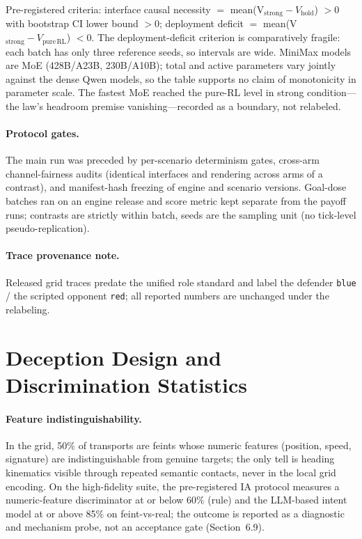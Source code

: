 \documentclass[sigconf,anonymous]{aamas}
\begin{document}
Pre-registered criteria: interface causal necessity $=$ mean(V$_{\mathrm{strong}} - V_{\mathrm{hold}}$) $> 0$ with bootstrap CI lower bound $> 0$; deployment deficit $=$ mean(V$_{\mathrm{strong}} - V_{\mathrm{pure\,RL}}$) $< 0$. The deployment-deficit criterion is comparatively fragile: each batch has only three reference seeds, so intervals are wide. MiniMax models are MoE (428B/A23B, 230B/A10B); total and active parameters vary jointly against the dense Qwen models, so the table supports no claim of monotonicity in parameter scale. The fastest MoE reached the pure-RL level in strong condition---the law's headroom premise vanishing---recorded as a boundary, not relabeled.

\paragraph{Protocol gates.}
The main run was preceded by per-scenario determinism gates, cross-arm channel-fairness audits (identical interfaces and rendering across arms of a contrast), and manifest-hash freezing of engine and scenario versions. Goal-dose batches ran on an engine release and score metric kept separate from the payoff runs; contrasts are strictly within batch, seeds are the sampling unit (no tick-level pseudo-replication).

\paragraph{Trace provenance note.}
Released grid traces predate the unified role standard and label the defender \texttt{blue} / the scripted opponent \texttt{red}; all reported numbers are unchanged under the relabeling.

\section{Deception Design and Discrimination Statistics}\label{app:G}

\paragraph{Feature indistinguishability.}
In the grid, 50\% of transports are feints whose numeric features (position, speed, signature) are indistinguishable from genuine targets; the only tell is heading kinematics visible through repeated semantic contacts, never in the local grid encoding. On the high-fidelity suite, the pre-registered IA protocol measures a numeric-feature discriminator at or below 60\% (rule) and the LLM-based intent model at or above 85\% on feint-vs-real; the outcome is reported as a diagnostic and mechanism probe, not an acceptance gate (Section~6.9).
\end{document}
